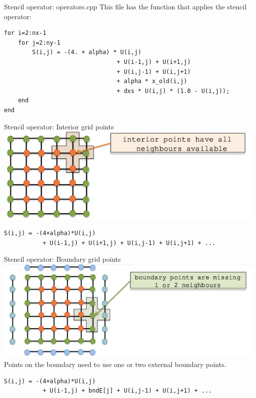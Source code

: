 \documentclass[aspectratio=43]{beamer}
\begin{document}
\begin{frame}[fragile]{Stencil operator: operators.cpp}
    This file has the function that applies the stencil operator:

\begin{lstlisting}[style=boxcudatiny]
for i=2:nx-1
    for j=2:ny-1
        S(i,j) = -(4. + alpha) * U(i,j)
                                + U(i-1,j) + U(i+1,j)
                                + U(i,j-1) + U(i,j+1)
                                + alpha * x_old(i,j)
                                + dxs * U(i,j) * (1.0 - U(i,j));
    end
end
\end{lstlisting}
\end{frame}

\begin{frame}[fragile]{Stencil operator: Interior grid points}
    \includegraphics[width=\textwidth]{./images/grid_interior.jpg} \\
\begin{lstlisting}[style=boxcudatiny]
    S(i,j) = -(4+alpha)*U(i,j)
           + U(i-1,j) + U(i+1,j) + U(i,j-1) + U(i,j+1) + ...
\end{lstlisting}
\end{frame}

\begin{frame}[fragile]{Stencil operator: Boundary grid points}
    \includegraphics[width=\textwidth]{./images/grid_boundary.jpg} \\
    Points on the boundary need to use one or two external boundary points. \\
\begin{lstlisting}[style=boxcudatiny]
    S(i,j) = -(4+alpha)*U(i,j)
           + U(i-1,j) + bndE[j] + U(i,j-1) + U(i,j+1) + ...
\end{lstlisting}
\end{frame}
\end{document}
